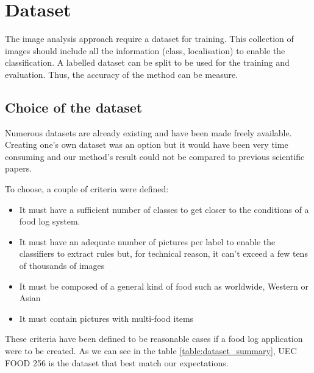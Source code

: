 \chapter{Dataset}  \label{sec:dataset}

The image analysis approach require a dataset for training. This collection of images should include all the information (class, localisation) to enable the classification. A labelled dataset can be split to be used for the training and evaluation. Thus, the accuracy of the method can be measure.

\section{Choice of the dataset}

Numerous datasets are already existing and have been made freely available. Creating one's own dataset was an option but it would have been very time consuming and our method's result could not be compared to previous scientific papers.

To choose, a couple of criteria were defined:
\begin{itemize}
    \item It must have a sufficient number of classes to get closer to the conditions of a food log system.
    \item It must have an adequate number of pictures per label to enable the classifiers to extract rules but, for technical reason, it can't exceed a few tens of thousands of images
    \item It must be composed of a general kind of food such as worldwide, Western or Asian
    \item It must contain pictures with multi-food items
\end{itemize}

These criteria have been defined to be reasonable cases if a food log application were to be created.
As we can see in the table \ref{table:dataset_summary}, UEC FOOD 256 is the dataset that best match our expectations.

